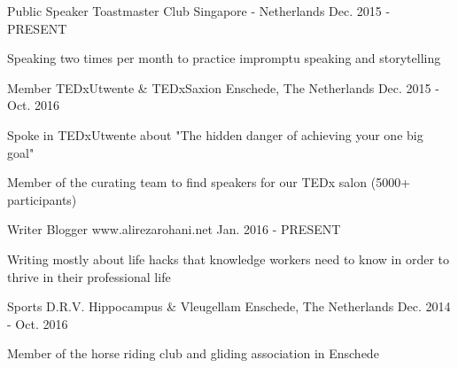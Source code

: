 

\begin{cventries}

  \cventry
    {Public Speaker} %
    {Toastmaster Club} %
    {Singapore - Netherlands} %
    {Dec. 2015 - PRESENT} %
    {
      \begin{cvitems} %
        \item {Speaking two times per month to practice impromptu speaking and storytelling}
      \end{cvitems}
    }

  \cventry
    {Member} %
    {TEDxUtwente \& TEDxSaxion} %
    {Enschede, The Netherlands} %
    {Dec. 2015 - Oct. 2016} %
    {
      \begin{cvitems} %
        \item {Spoke in TEDxUtwente about "The hidden danger of achieving your one big goal" }
        \item {Member of the curating team to find speakers for our TEDx salon (5000+ participants)}
      \end{cvitems}
    }

  \cventry
    {Writer} %
    {Blogger} %
    {www.alirezarohani.net} %
    {Jan. 2016 - PRESENT} %
    {
      \begin{cvitems} %
        \item {Writing mostly about life hacks that knowledge workers need to know in order to thrive in their professional life}
       \end{cvitems}
    }
  \cventry
    {Sports} %
    {D.R.V. Hippocampus \& Vleugellam } %
    {Enschede, The Netherlands} %
    {Dec. 2014 - Oct. 2016} %
    {
      \begin{cvitems} %
        \item {Member of the horse riding club and gliding association in Enschede }
      \end{cvitems}
    }


\end{cventries}
